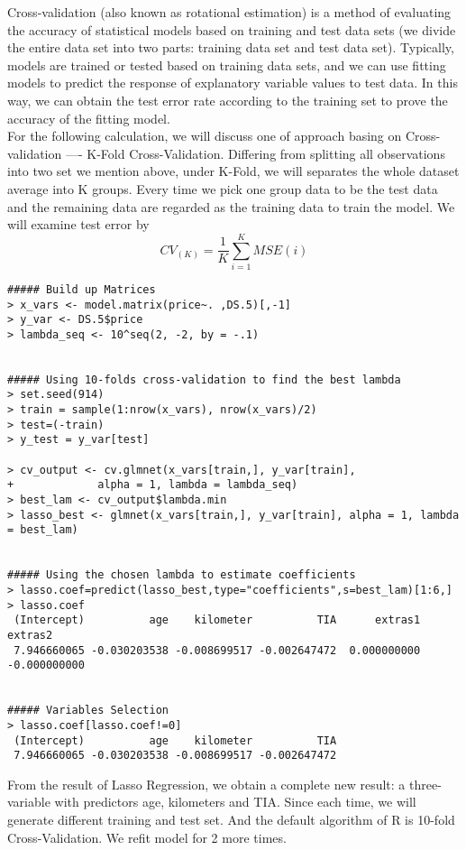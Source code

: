 \documentclass[a4paper]{article}
\begin{document}
\noindent
Cross-validation (also known as rotational estimation) is a method of evaluating the accuracy of statistical models based on training and test data sets (we divide the entire data set into two parts: training data set and test data set). Typically, models are trained or tested based on training data sets, and we can use fitting models to predict the response of explanatory variable values to test data. In this way, we can obtain the test error rate according to the training set to prove the accuracy of the fitting model.\\

\noindent
For the following calculation, we will discuss one of approach basing on Cross-validation ---- K-Fold Cross-Validation. Differing from splitting all observations into two set we mention above, under K-Fold, we will separates the whole dataset average into K groups. Every time we pick one group data to be the test data and the remaining data are regarded as the training data to train the model. We will examine test error by \[CV_{(K)} = \frac{1}{K} \sum_{i=1}^{K}MSE(i)\]



\begin{verbatim}
##### Build up Matrices
> x_vars <- model.matrix(price~. ,DS.5)[,-1]
> y_var <- DS.5$price
> lambda_seq <- 10^seq(2, -2, by = -.1)


##### Using 10-folds cross-validation to find the best lambda 
> set.seed(914)
> train = sample(1:nrow(x_vars), nrow(x_vars)/2)
> test=(-train)
> y_test = y_var[test]

> cv_output <- cv.glmnet(x_vars[train,], y_var[train], 
+             alpha = 1, lambda = lambda_seq)
> best_lam <- cv_output$lambda.min
> lasso_best <- glmnet(x_vars[train,], y_var[train], alpha = 1, lambda = best_lam)


##### Using the chosen lambda to estimate coefficients
> lasso.coef=predict(lasso_best,type="coefficients",s=best_lam)[1:6,]
> lasso.coef
 (Intercept)          age    kilometer          TIA      extras1      extras2 
 7.946660065 -0.030203538 -0.008699517 -0.002647472  0.000000000 -0.000000000  


##### Variables Selection
> lasso.coef[lasso.coef!=0]
 (Intercept)          age    kilometer          TIA 
 7.946660065 -0.030203538 -0.008699517 -0.002647472 

\end{verbatim}
From the result of Lasso Regression, we obtain a complete new result: a three-variable with predictors age, kilometers and TIA. Since each time, we will generate different training and test set. And the default algorithm of R is 10-fold Cross-Validation. We refit model for 2 more times. 
\end{document}
